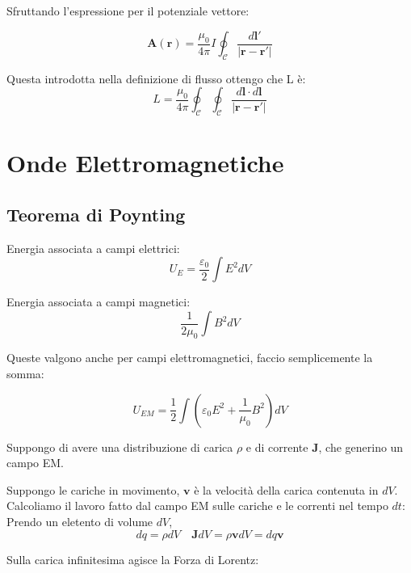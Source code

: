 \documentclass[a4paper]{scrarticle}
\begin{document}
Sfruttando l'espressione per il potenziale vettore:

\begin{equation}
    \bm A (\bm r) = \frac{\mu_0}{4\pi} I \oint_{\mathcal{C}} \frac{d \bm l'}{|\bm r - \bm r'|}
\end{equation}

Questa introdotta nella definizione di flusso ottengo che L è:
\begin{equation}
    L = \frac{\mu_0}{4\pi} \oint_{\mathcal{C}}\oint_{\mathcal{C}} \frac{d\bm l\cdot d\bm l}{|\bm r - \bm r'|}
\end{equation}

\section{Onde Elettromagnetiche}

\subsection{Teorema di Poynting}

Energia associata a campi elettrici:
\begin{equation*}
    U_E = \frac{\varepsilon_0}{2} \int E^2 dV 
\end{equation*}

Energia associata a campi magnetici:
\begin{equation*}
    \frac{1}{2 \mu_0} \int B^2 dV
\end{equation*}

Queste valgono anche per campi elettromagnetici, faccio semplicemente la somma:

\begin{equation}
    U_{EM} = \frac{1}{2} \int (\varepsilon_0 E^2 + \frac{1}{\mu_0} B^2)dV
\end{equation}

Suppongo di avere una distribuzione di carica $\rho$ e di corrente $\bm J$, che generino un campo EM.

Suppongo le cariche in movimento, $\bm v$ è la velocità della carica contenuta in $dV$.
Calcoliamo il lavoro fatto dal campo EM sulle cariche e le correnti nel tempo $dt$:
Prendo un eletento di volume $dV$,
\begin{equation*}
    dq = \rho dV \quad \bm J dV = \rho \bm v dV = dq \bm v
\end{equation*}

Sulla carica infinitesima agisce la Forza di Lorentz:
\end{document}

